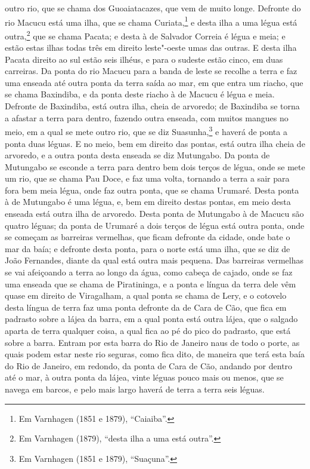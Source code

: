 outro rio, que se chama dos Guoaiatacazes, que vem de muito longe. Defronte do rio Macucu
está uma ilha, que se chama Curiata,\footnote{ Em Varnhagen (1851 e 1879), ``Caiaiba''.} e
desta ilha a uma légua está outra,\footnote{ Em Varnhagen (1879), ``desta ilha a uma está
outra''.} que se chama Pacata; e desta à de Salvador Correia é légua e meia; e estão estas
ilhas todas três em direito leste"-oeste umas das outras. E desta ilha Pacata direito ao
sul estão seis ilhéus, e para o sudeste estão cinco, em duas carreiras. Da ponta do rio
Macucu para a banda de leste se recolhe a terra e faz uma enseada até outra ponta da terra
saída ao mar, em que entra um riacho, que se chama Baxindiba, e da ponta deste riacho à de
Macucu é légua e meia. Defronte de Baxindiba, está outra ilha, cheia de arvoredo; de
Baxindiba se torna a afastar a terra para dentro, fazendo outra enseada, com muitos
mangues no meio, em a qual se mete outro rio, que se diz Suasunha,\footnote{ Em Varnhagen
(1851 e 1879), ``Suaçuna''.} e haverá de ponta a ponta duas léguas. E no meio, bem em
direito das pontas, está outra ilha cheia de arvoredo, e a outra ponta desta enseada se
diz Mutungabo. Da ponta de Mutungabo se esconde a terra para dentro bem dois terços de
légua, onde se mete um rio, que se chama Pau Doce, e faz uma volta, tornando a terra a
sair para fora bem meia légua, onde faz outra ponta, que se chama Urumaré. Desta ponta à
de Mutungabo é uma légua, e, bem em direito destas pontas, em meio desta enseada está
outra ilha de arvoredo. Desta ponta de Mutungabo à de Macucu são quatro léguas; da ponta
de Urumaré a dois terços de légua está outra ponta, onde se começam as barreiras
vermelhas, que ficam defronte da cidade, onde bate o mar da baía; e defronte desta ponta,
para o norte está uma ilha, que se diz de João Fernandes, diante da qual está outra mais
pequena. Das barreiras vermelhas se vai afeiçoando a terra ao longo da água, como cabeça
de cajado, onde se faz uma enseada que se chama de Piratininga, e a ponta e língua da
terra dele vêm quase em direito de Viragalham, a qual ponta se chama de Lery, e o cotovelo
desta língua de terra faz uma ponta defronte da de Cara de Cão, que fica em padrasto sobre
a lájea da barra, em a qual ponta está outra lájea, que o salgado aparta de terra qualquer
coisa, a qual fica ao pé do pico do padrasto, que está sobre a barra. Entram por esta
barra do Rio de Janeiro naus de todo o porte, as quais podem estar neste rio seguras, como
fica dito, de maneira que terá esta baía do Rio de Janeiro, em redondo, da ponta de Cara
de Cão, andando por dentro até o mar, à outra ponta da lájea, vinte léguas pouco mais ou
menos, que se navega em barcos, e pelo mais largo haverá de terra a terra seis léguas.

